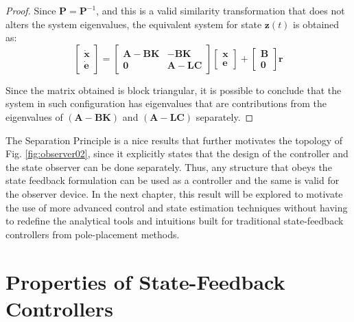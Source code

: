 \documentclass[a4paper,11pt]{book}
\numberwithin{figure}{chapter}
\numberwithin{equation}{chapter}
\numberwithin{table}{chapter}
\theoremstyle{definition}
\begin{document}
\begin{proof}
Since $\bm{P} = \bm{P}^{-1}$, and this is a valid similarity transformation that does not alters the system eigenvalues, the equivalent system for state $\bm{z}(t)$ is obtained as:
\begin{equation}
	\begin{bmatrix} \dot{\bm{x}} \\ \dot{\bm{e}}	\end{bmatrix}
	=
	\begin{bmatrix}
		\bm{A} - \bm{B} \bm{K} & - \bm{B} \bm{K} \\
		\bm{0} & \bm{A} - \bm{L} \bm{C}
	\end{bmatrix} \begin{bmatrix} \bm{x} \\ \bm{e} \end{bmatrix}
	+
	\begin{bmatrix}	\bm{B} \\ \bm{0} \end{bmatrix} \bm{r}
\end{equation} \vskip0.2cm

Since the matrix obtained is block triangular, it is possible to conclude that the system in such configuration has eigenvalues that are contributions from the eigenvalues of $\left( \bm{A} - \bm{B} \bm{K} \right)$ and $\left( \bm{A} - \bm{L} \bm{C} \right)$ separately.
\end{proof}

The Separation Principle is a nice results that further motivates the topology of Fig. \ref{fig:observer02}, since it explicitly states that the design of the controller and the state observer can be done separately. Thus, any structure that obeys the state feedback formulation can be used as a controller and the same is valid for the observer device. In the next chapter, this result will be explored to motivate the use of more advanced control and state estimation techniques without having to redefine the analytical tools and intuitions built for traditional state-feedback controllers from pole-placement methods.

\section{Properties of State-Feedback Controllers}
\end{document}
